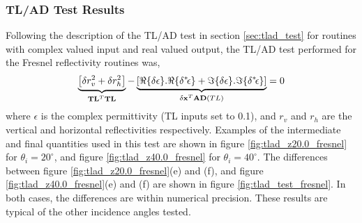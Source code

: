 \subsubsection{TL/AD Test Results}
Following the description of the TL/AD test in section \ref{sec:tlad_test} for routines with complex valued input and real valued output, the TL/AD test performed for the Fresnel reflectivity routines was,
\begin{equation}
  \underbrace{\left[\delta r_{v}^2 + \delta r_{h}^2\right]}_{\mathbf{TL}^{T}\mathbf{TL}} - \underbrace{\left[\Re\{\delta\epsilon\}.\Re\{\delta^{*}\! \epsilon\} + \Im\{\delta\epsilon\}.\Im\{\delta^{*}\! \epsilon\}\right]}_{\mathbf{\delta x}^{T}\mathbf{AD}(TL)} = 0
  \label{eqn:tlad_fresnel}
\end{equation}
where $\epsilon$ is the complex permittivity (TL inputs set to 0.1), and $r_v$ and $r_h$ are the vertical and horizontal reflectivities respectively. Examples of the intermediate and final quantities used in this test are shown in figure \ref{fig:tlad_z20.0_fresnel} for $\theta_{i} = 20^{\circ}$, and figure \ref{fig:tlad_z40.0_fresnel} for $\theta_{i} = 40^{\circ}$. The differences between figure \ref{fig:tlad_z20.0_fresnel}(e) and (f), and figure \ref{fig:tlad_z40.0_fresnel}(e) and (f) are shown in figure \ref{fig:tlad_test_fresnel}. In both cases, the differences are within numerical precision. These results are typical of the other incidence angles tested.

